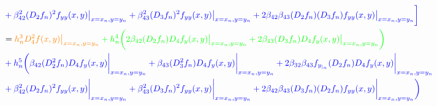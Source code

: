 \documentclass[12 pt]{article}
\begin{document}
\begin{align*}
		&\color{blue}+\beta_{42}^{2}(D_{2}f_{n})^{2}f_{yy}(x,y)\big\vert_{x = x_{n}, y= y_{n}} + \beta_{43}^{2}(D_{3}f_{n})^{2}f_{yy}(x,y)\big\vert_{x = x_{n}, y= y_{n}} + 2\beta_{42}\beta_{43}(D_{2}f_{n})(D_{3}f_{n})f_{yy}(x,y)\big\vert_{x = x_{n}, y= y_{n}}\bigg]\\
		&=  \color{orange}h_{n}^{3}D_{4}^{2}f(x,y)\big\vert_{x = x_{n}, y= y_{n}} \color{green}+ h_{n}^{4}\bigg(2\beta_{42}(D_{2}f_{n})D_{4}f_{y}(x,y)\big\vert_{x = x_{n}, y= y_{n}} + 2\beta_{43}(D_{3}f_{n})D_{4}f_{y}(x,y)\big\vert_{x = x_{n}, y= y_{n}}\bigg) \\
		&\color{blue}+h_{n}^{5}\bigg(\beta_{42}(D_{2}^{2}f_{n})D_{4}f_{y}(x,y)\bigg\vert_{x=x_{n}, y= y_{n}} + \beta_{43}(D_{3}^{2}f_{n})D_{4}f_{y}(x,y)\bigg\vert_{x=x_{n}, y= y_{n}} + 2\beta_{32}\beta_{43}f_{y_{|_{n}}}(D_{2}f_{n})D_{4}f_{y}(x,y)\bigg\vert_{x=x_{n}, y= y_{n}}\\
		&\color{blue}+ \beta_{42}^{2}(D_{2}f_{n})^{2}f_{yy}(x,y)\bigg\vert_{x=x_{n}, y= y_{n}} + \beta_{43}^{2}(D_{3}f_{n})^{2}f_{yy}(x,y)\bigg\vert_{x=x_{n}, y= y_{n}} + 2\beta_{42}\beta_{43}(D_{3}f_{n})(D_{2}f_{n})f_{yy}(x,y)\bigg\vert_{x=x_{n}, y= y_{n}}\bigg)
	\end{align*}
	
\end{document}
